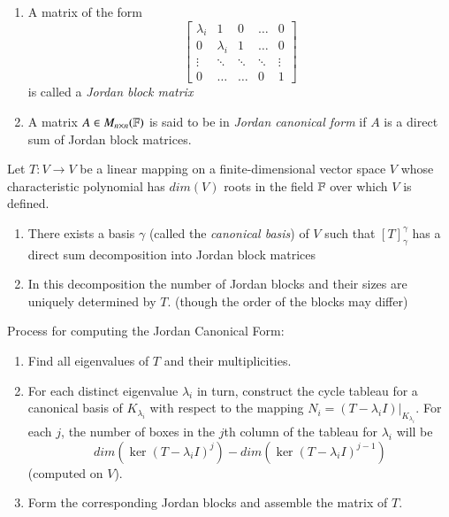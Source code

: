 \documentclass[12pt, a4paper, oneside, openright, titlepage]{book}
\begin{document}
\begin{defn}
    \leavevmode
    \begin{enumerate}
        \item A matrix of the form $$\begin{bmatrix} \lambda_i & 1 & 0 & \hdots & 0 \\ 0 & \lambda_i & 1 & \hdots & 0 \\ \vdots & \ddots & \ddots & \ddots & \vdots \\ 0 & \hdots & \hdots & 0 & 1 \end{bmatrix}$$ is called a \emph{Jordan block matrix}
        \item A matrix $A \in M_{n\times n}(\mathbb F)$ is said to be in \emph{Jordan canonical form} if $A$ is a direct sum of Jordan block matrices.
    \end{enumerate}
\end{defn}


\begin{thm}
    Let $T:V\rightarrow V$ be a linear mapping on a finite-dimensional vector space $V$ whose characteristic polynomial has $dim(V)$ roots in the field $\mathbb F$ over which $V$ is defined. \begin{enumerate}
        \item There exists a basis $\gamma$ (called the \emph{canonical basis}) of $V$ such that $[T]_{\gamma}^{\gamma}$ has a direct sum decomposition into Jordan block matrices
        \item In this decomposition the number of Jordan blocks and their sizes are uniquely determined by $T$. (though the order of the blocks may differ)
    \end{enumerate}
\end{thm}

\begin{rmk}
    Process for computing the Jordan Canonical Form:
    \begin{enumerate}
        \item Find all eigenvalues of $T$ and their multiplicities.
        \item For each distinct eigenvalue $\lambda_i$ in turn, construct the cycle tableau for a canonical basis of $K_{\lambda_i}$ with respect to the mapping $N_i = (T-\lambda_i I)\rvert_{K_{\lambda_i}}$. For each $j$, the number of boxes in the $j$th column of the tableau for $\lambda_i$ will be $$dim(\ker(T-\lambda_iI)^j) - dim(\ker(T-\lambda_iI)^{j-1})$$
        (computed on $V$). 
        \item Form the corresponding Jordan blocks and assemble the matrix of $T$.
    \end{enumerate}
\end{rmk}
\end{document}
